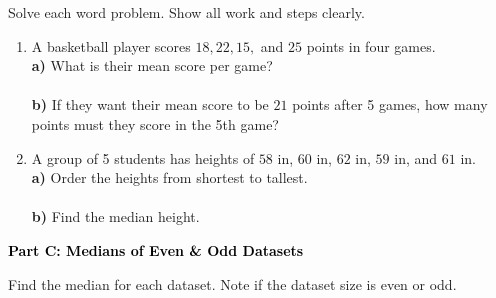 \documentclass[12pt, letterpaper, fleqn]{article}
\newcommand{\blanklong}{\underline{\hspace{6.5cm}}}
\begin{document}
\vspace{3mm}

\noindent
Solve each word problem. Show all work and steps clearly.

\vspace{5mm}

\begin{enumerate}[itemsep=2.5cm, leftmargin=0.6cm]
\item A basketball player scores $18, 22, 15,$ and $25$ points in four games. \\
\textbf{a)} What is their mean score per game? \\
\blanklong \\
\textbf{b)} If they want their mean score to be $21$ points after 5 games, how many points must they score in the 5th game? \\
\blanklong

\item A group of 5 students has heights of $58$ in, $60$ in, $62$ in, $59$ in, and $61$ in. \\
\textbf{a)} Order the heights from shortest to tallest. \\
\blanklong \\
\textbf{b)} Find the median height. \\
\blanklong
\end{enumerate}

\newpage

\begin{tcolorbox}[colback=black!10]
    \large\textcolor{black}{\textbf{Part C: Medians of Even \& Odd Datasets}}
\end{tcolorbox}

\vspace{3mm}

\noindent
Find the median for each dataset. Note if the dataset size is even or odd.

\vspace{5mm}
\end{document}
